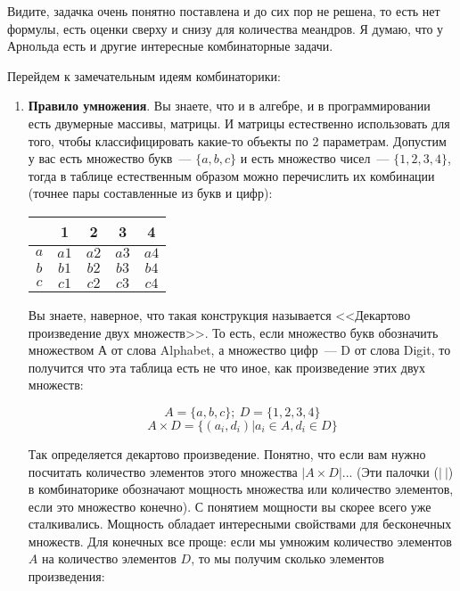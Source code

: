 \documentclass[russian]{lecture-notes}
\theoremstyle{definition}
\begin{document}
	Видите, задачка очень понятно поставлена и до сих пор не решена, то есть нет формулы, есть оценки сверху и снизу для количества меандров. Я думаю, что у Арнольда есть и другие интересные комбинаторные задачи.
	
	
	Перейдем к замечательным идеям комбинаторики:
	\begin{enumerate}
		\item \textbf{Правило умножения}. Вы знаете, что и в алгебре, и в программировании есть двумерные массивы, матрицы. И матрицы естественно использовать для того, чтобы классифицировать какие-то объекты по 2 параметрам. Допустим у вас есть множество букв~--- $\{a, b, c\}$ и есть множество чисел~--- $\{1, 2, 3, 4\}$, тогда в таблице естественным образом можно перечислить их комбинации (точнее пары составленные из букв и цифр):
		
		\begin{table}[H]
			\centering
			\begin{tabular}{|c|c|c|c|c|}
				\cline{2-5}
				\multicolumn{1}{c|}{} & 1 & 2 & 3 & 4 \\ \hline
				$a$ & $a1$ & $a2$ & $a3$ & $a4$ \\ \hline
				$b$ & $b1$ & $b2$ & $b3$ & $b4$ \\ \hline
				$c$ & $c1$ & $c2$ & $c3$ & $c4$ \\ \hline
			\end{tabular}
		\end{table}
	
		Вы знаете, наверное, что такая конструкция называется <<Декартово произведение двух множеств>>. То есть, если множество букв обозначить множеством А от слова Alphabet, а множество цифр~--- D от слова Digit, то получится что эта таблица есть не что иное, как произведение этих двух множеств:
		
		\[
			A = \{a, b, c\}; \ D = \{1, 2, 3, 4\}
		\]
		\[
			A \times D = \{(a_i, d_i) | a_i \in A, d_i \in D\}
		\]
		
		\noindent Так определяется декартово произведение. Понятно, что если вам нужно посчитать количество элементов этого множества $|A \times D|$... (Эти палочки ($| \ |$) в комбинаторике обозначают мощность множества или количество элементов, если это множество конечно). С понятием мощности вы скорее всего уже сталкивались. Мощность обладает интересными свойствами для бесконечных множеств. Для конечных все проще: если мы умножим количество элементов $A$ на количество элементов $D$, то мы получим сколько элементов произведения:
		

\end{enumerate}
\end{document}
